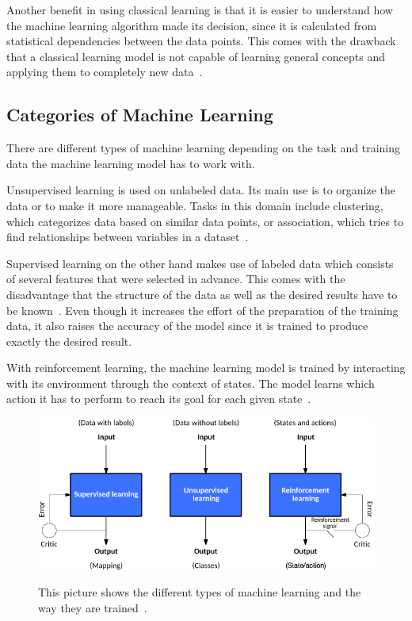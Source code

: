 Another benefit in using classical learning is that it is easier to understand how the machine learning algorithm made its decision, since it is calculated from statistical dependencies between the data points. This comes with the drawback that a classical learning model is not capable of learning general concepts and applying them to completely new data~\cite{what-is-ml}.

\subsection{Categories of Machine Learning}
There are different types of machine learning depending on the task and training data the machine learning model has to work with.

Unsupervised learning is used on unlabeled data. Its main use is to organize the data or to make it more manageable. Tasks in this domain include clustering, which categorizes data based on similar data points, or association, which tries to find relationships between variables in a dataset~\cite{supervised-unsupervised-learning}.

Supervised learning on the other hand makes use of labeled data which consists of several features that were selected in advance. This comes with the disadvantage that the structure of the data as well as the desired results have to be known~\cite{classical-ml}. Even though it increases the effort of the preparation of the training data, it also raises the accuracy of the model since it is trained to produce exactly the desired result.

With reinforcement learning, the machine learning model is trained by interacting with its environment through the context of states. The model learns which action it has to perform to reach its goal for each given state~\cite{types-of-ml}.

\begin{figure}[ht]
  \caption[Different kinds of machine learning]{This picture shows the different types of machine learning and the way they are trained~\cite{types-of-ml}.}
  \centering
  \includegraphics[width=\linewidth]{img/types_of_machine_learning.png}\label{fig:kinds_of_ml}
\end{figure}

\newpage{}